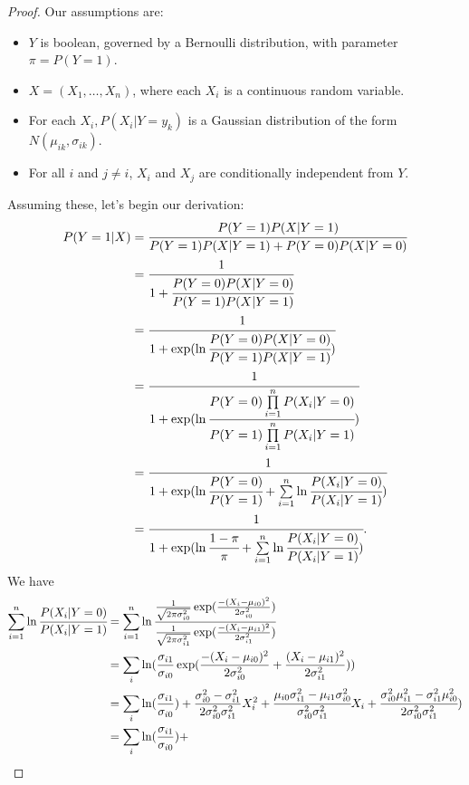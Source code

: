 \documentclass[12pt]{article}
\begin{document}
\begin{proof}
  Our assumptions are:
  \begin{itemize}
  \item
    $Y$ is boolean, governed by a Bernoulli distribution, with parameter $\pi = P(Y = 1)$.
  \item
    $X = (X_1, \dots, X_n)$, where each $X_i$ is a continuous random variable.
  \item
    For each $X_i, P(X_i | Y=y_k)$ is a Gaussian distribution of the form $N(\mu_{ik}, \sigma_{ik})$.
  \item
    For all $i$ and $j \neq i$, $X_i$ and $X_j$ are conditionally independent from $Y$.
  \end{itemize}
  Assuming these, let's begin our derivation:
  \begin{align*}
    P(Y=1|X)
    &= \cfrac{P(Y=1)P(X|Y=1)}{P(Y=1)P(X|Y=1) + P(Y=0)P(X|Y=0)} \\
    &= \cfrac{1}{1 + \cfrac{P(Y=0)P(X|Y=0)}{P(Y=1)P(X|Y=1)}} \\
    &= \cfrac{1}{1+\exp(\ln\cfrac{P(Y=0)P(X|Y=0)}{P(Y=1)P(X|Y=1)})} \\
    &= \cfrac{1}{1+\exp(\ln\cfrac{P(Y=0)\prod\limits_{i=1}^nP(X_i|Y=0)}{P(Y=1)\prod\limits_{i=1}^nP(X_i|Y=1)})} \\
    &= \cfrac{1}{1+\exp(\ln\cfrac{P(Y=0)}{P(Y=1)} + \sum\limits_{i=1}^n\ln\cfrac{P(X_i|Y=0)}{P(X_i|Y=1)})} \\
    &= \cfrac{1}{1+\exp(\ln\cfrac{1-\pi}{\pi} + \sum\limits_{i=1}^n\ln\cfrac{P(X_i|Y=0)}{P(X_i|Y=1)})}.
  \end{align*}
  We have
  \begin{align*}
    \sum\limits_{i=1}^n\ln\cfrac{P(X_i|Y=0)}{P(X_i|Y=1)}
    &= \sum\limits_{i=1}^n\ln
    \cfrac{\frac{1}{\sqrt{2\pi\sigma_{i0}^2}}\exp(\frac{-(X_i-\mu_{i0})^2}{2\sigma_{i0}^2})}{\frac{1}{\sqrt{2\pi\sigma_{i1}^2}}\exp(\frac{-(X_i-\mu_{i1})^2}{2\sigma_{i1}^2})} \\
    &= \sum\limits_i \ln(\frac{\sigma_{i1}}{\sigma_{i0}}\exp(\frac{-(X_i-\mu_{i0})^2}{2\sigma_{i0}^2} + \frac{(X_i-\mu_{i1})^2}{2\sigma_{i1}^2})) \\
    &=\sum\limits_i \ln(\frac{\sigma_{i1}}{\sigma_{i0}}) +
    \frac{\sigma_{i0}^2-\sigma_{i1}^2}{2\sigma_{i0}^2\sigma_{i1}^2}X_i^2 + \cfrac{\mu_{i0}\sigma_{i1}^2-\mu_{i1}\sigma_{i0}^2}{\sigma_{i0}^2\sigma_{i1}^2}X_i +
    \cfrac{\sigma_{i0}^2\mu_{i1}^2 - \sigma_{i1}^2\mu_{i0}^2}{2\sigma_{i0}^2\sigma_{i1}^2}) \\
    &=\sum\limits_i \ln(\frac{\sigma_{i1}}{\sigma_{i0}}) +

\end{align*}
\end{proof}
\end{document}
